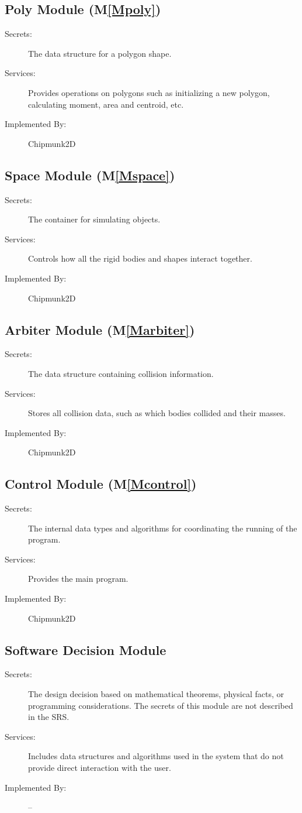 \documentclass[12pt]{article}
\begin{document}
\subsection{Poly Module (M\ref{Mpoly})}
\label{Sec:PM()}
\begin{description}
\item[Secrets:]The data structure for a polygon shape.
\item[Services:]Provides operations on polygons such as initializing a new polygon, calculating moment, area and centroid, etc.
\item[Implemented By:]Chipmunk2D
\end{description}
\subsection{Space Module (M\ref{Mspace})}
\label{Sec:SM()}
\begin{description}
\item[Secrets:]The container for simulating objects.
\item[Services:]Controls how all the rigid bodies and shapes interact together.
\item[Implemented By:]Chipmunk2D
\end{description}
\subsection{Arbiter Module (M\ref{Marbiter})}
\label{Sec:AM()}
\begin{description}
\item[Secrets:]The data structure containing collision information.
\item[Services:]Stores all collision data, such as which bodies collided and their masses.
\item[Implemented By:]Chipmunk2D
\end{description}
\subsection{Control Module (M\ref{Mcontrol})}
\label{Sec:CM()}
\begin{description}
\item[Secrets:]The internal data types and algorithms for coordinating the running of the program.
\item[Services:]Provides the main program.
\item[Implemented By:]Chipmunk2D
\end{description}
\subsection{Software Decision Module}
\label{Sec:SDM}
\begin{description}
\item[Secrets:]The design decision based on mathematical theorems, physical facts, or programming considerations. The secrets of this module are not described in the SRS.
\item[Services:]Includes data structures and algorithms used in the system that do not provide direct interaction with the user.
\item[Implemented By:]--
\end{description}
\end{document}
